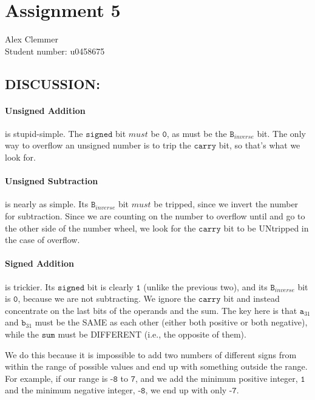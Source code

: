 \documentclass[a4paper]{article}
\begin{document}
\section*{Assignment 5 }
Alex Clemmer\\
Student number: u0458675

\subsection*{DISCUSSION:}
\paragraph*{Unsigned Addition} is stupid-simple. The $\texttt{signed}$ bit $\textit{must}$ be $\texttt{0}$, as must be the $\texttt{B}_{inverse}$ bit. The only way to overflow an unsigned number is to trip the $\texttt{carry}$ bit, so that's what we look for.

\paragraph*{Unsigned Subtraction} is nearly as simple. Its $\texttt{B}_{inverse}$ bit $\textit{must}$ be tripped, since we invert the number for subtraction. Since we are counting on the number to overflow until and go to the other side of the number wheel, we look for the $\texttt{carry}$ bit to be UNtripped in the case of overflow.

\paragraph*{Signed Addition} is trickier. Its $\texttt{signed}$ bit is clearly $\texttt{1}$ (unlike the previous two), and its $\texttt{B}_{inverse}$ bit is $\texttt{0}$, because we are not subtracting. We ignore the $\texttt{carry}$ bit and instead concentrate on the last bits of the operands and the sum. The key here is that $\texttt{a}_{31}$ and $\texttt{b}_{31}$ must be the SAME as each other (either both positive or both negative), while the $\texttt{sum}$ must be DIFFERENT (i.e., the opposite of them).

We do this because it is impossible to add two numbers of different signs from within the range of possible values and end up with something outside the range. For example, if our range is $\texttt{-8}$ to $\texttt{7}$, and we add the minimum positive integer, $\texttt{1}$ and the minimum negative integer, $\texttt{-8}$, we end up with only $\texttt{-7}$.
\end{document}
